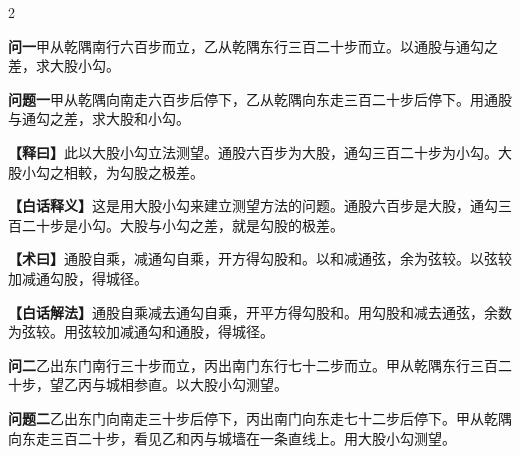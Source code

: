 \documentclass[11pt,a4paper]{article}
\newcommand{\WenQuestion}[1]{\textbf{\textcolor{classicalcolor}{#1}}}
\newcommand{\BaiQuestion}[1]{\textbf{\textcolor{moderncolor}{#1}}}
\newcommand{\WenExplain}{\textcolor{classicalcolor}{\textbf{【释曰】}}}
\newcommand{\BaiExplain}{\textcolor{moderncolor}{\textbf{【白话释义】}}}
\newcommand{\WenMethod}{\textcolor{classicalcolor}{\textbf{【术曰】}}}
\newcommand{\BaiMethod}{\textcolor{moderncolor}{\textbf{【白话解法】}}}
\begin{document}
\begin{paracol}{2}

\switchcolumn*
\begin{tcolorbox}[colback=red!3,colframe=red!30!black,boxrule=0.3pt]
\WenQuestion{问一}\quad 甲从乾隅南行六百步而立，乙从乾隅东行三百二十步而立。以通股与通勾之差，求大股小勾。
\end{tcolorbox}
\switchcolumn
\begin{tcolorbox}[colback=blue!3,colframe=blue!30!black,boxrule=0.3pt]
\BaiQuestion{问题一}\quad 甲从乾隅向南走六百步后停下，乙从乾隅向东走三百二十步后停下。用通股与通勾之差，求大股和小勾。
\end{tcolorbox}

\switchcolumn*
\begin{tcolorbox}[colback=red!5,colframe=red!30!black,boxrule=0.3pt]
\WenExplain\quad 此以大股小勾立法测望。通股六百步为大股，通勾三百二十步为小勾。大股小勾之相較，为勾股之极差。
\end{tcolorbox}
\switchcolumn
\begin{tcolorbox}[colback=blue!5,colframe=blue!30!black,boxrule=0.3pt]
\BaiExplain\quad 这是用大股小勾来建立测望方法的问题。通股六百步是大股，通勾三百二十步是小勾。大股与小勾之差，就是勾股的极差。
\end{tcolorbox}

\switchcolumn*
\begin{tcolorbox}[colback=red!5,colframe=red!40!black,boxrule=0.3pt]
\WenMethod\quad 通股自乘，减通勾自乘，开方得勾股和。以和减通弦，余为弦较。以弦较加减通勾股，得城径。
\end{tcolorbox}
\switchcolumn
\begin{tcolorbox}[colback=blue!5,colframe=blue!40!black,boxrule=0.3pt]
\BaiMethod\quad 通股自乘减去通勾自乘，开平方得勾股和。用勾股和减去通弦，余数为弦较。用弦较加减通勾和通股，得城径。
\end{tcolorbox}

\vspace{0.8em}

\switchcolumn*
\begin{tcolorbox}[colback=red!3,colframe=red!30!black,boxrule=0.3pt]
\WenQuestion{问二}\quad 乙出东门南行三十步而立，丙出南门东行七十二步而立。甲从乾隅东行三百二十步，望乙丙与城相参直。以大股小勾测望。
\end{tcolorbox}
\switchcolumn
\begin{tcolorbox}[colback=blue!3,colframe=blue!30!black,boxrule=0.3pt]
\BaiQuestion{问题二}\quad 乙出东门向南走三十步后停下，丙出南门向东走七十二步后停下。甲从乾隅向东走三百二十步，看见乙和丙与城墙在一条直线上。用大股小勾测望。
\end{tcolorbox}


\end{paracol}
\end{document}
